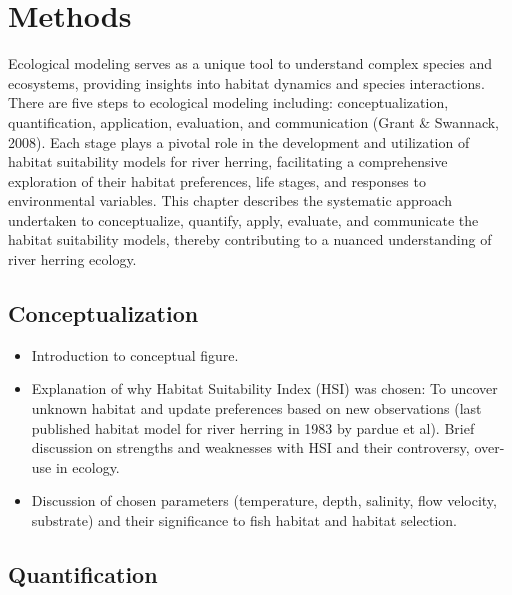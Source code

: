 \documentclass[
]{book}
\begin{document}
\hypertarget{method}{%
\chapter{Methods}\label{method}}

Ecological modeling serves as a unique tool to understand complex species and ecosystems, providing insights into habitat dynamics and species interactions. There are five steps to ecological modeling including: conceptualization, quantification, application, evaluation, and communication (Grant \& Swannack, 2008). Each stage plays a pivotal role in the development and utilization of habitat suitability models for river herring, facilitating a comprehensive exploration of their habitat preferences, life stages, and responses to environmental variables. This chapter describes the systematic approach undertaken to conceptualize, quantify, apply, evaluate, and communicate the habitat suitability models, thereby contributing to a nuanced understanding of river herring ecology.

\hypertarget{conceptualization}{%
\section{Conceptualization}\label{conceptualization}}

\begin{itemize}
\item
  Introduction to conceptual figure.
\item
  Explanation of why Habitat Suitability Index (HSI) was chosen: To uncover unknown habitat and update preferences based on new observations (last published habitat model for river herring in 1983 by pardue et al). Brief discussion on strengths and weaknesses with HSI and their controversy, over-use in ecology.
\item
  Discussion of chosen parameters (temperature, depth, salinity, flow velocity, substrate) and their significance to fish habitat and habitat selection.
\end{itemize}

\hypertarget{quantification}{%
\section{Quantification}\label{quantification}}
\end{document}
